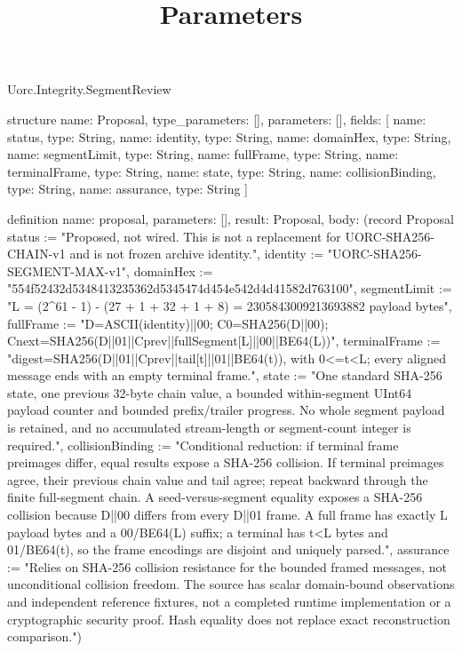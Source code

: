 \begin{lexlean}{Uorc.Integrity.SegmentReview}
\title{Parameters}
\begin{semanticmodule}
structure{
  name: Proposal,
  type_parameters: [],
  parameters: [],
  fields: [
    {name: status, type: String},
    {name: identity, type: String},
    {name: domainHex, type: String},
    {name: segmentLimit, type: String},
    {name: fullFrame, type: String},
    {name: terminalFrame, type: String},
    {name: state, type: String},
    {name: collisionBinding, type: String},
    {name: assurance, type: String}
  ]
}

definition{
  name: proposal,
  parameters: [],
  result: Proposal,
  body: (record Proposal {status := "Proposed, not wired. This is not a replacement for UORC-SHA256-CHAIN-v1 and is not frozen archive identity.", identity := "UORC-SHA256-SEGMENT-MAX-v1", domainHex := "554f52432d5348413235362d5345474d454e542d4d41582d763100", segmentLimit := "L = (2^61 - 1) - (27 + 1 + 32 + 1 + 8) = 2305843009213693882 payload bytes", fullFrame := "D=ASCII(identity)||00; C0=SHA256(D||00); Cnext=SHA256(D||01||Cprev||fullSegment[L]||00||BE64(L))", terminalFrame := "digest=SHA256(D||01||Cprev||tail[t]||01||BE64(t)), with 0<=t<L; every aligned message ends with an empty terminal frame.", state := "One standard SHA-256 state, one previous 32-byte chain value, a bounded within-segment UInt64 payload counter and bounded prefix/trailer progress. No whole segment payload is retained, and no accumulated stream-length or segment-count integer is required.", collisionBinding := "Conditional reduction: if terminal frame preimages differ, equal results expose a SHA-256 collision. If terminal preimages agree, their previous chain value and tail agree; repeat backward through the finite full-segment chain. A seed-versus-segment equality exposes a SHA-256 collision because D||00 differs from every D||01 frame. A full frame has exactly L payload bytes and a 00/BE64(L) suffix; a terminal has t<L bytes and 01/BE64(t), so the frame encodings are disjoint and uniquely parsed.", assurance := "Relies on SHA-256 collision resistance for the bounded framed messages, not unconditional collision freedom. The source has scalar domain-bound observations and independent reference fixtures, not a completed runtime implementation or a cryptographic security proof. Hash equality does not replace exact reconstruction comparison."})
}


\end{semanticmodule}
\end{lexlean}
